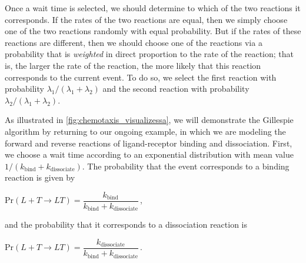 Once a wait time is selected, we should determine to which of the two reactions it corresponds. If the rates of the two reactions are equal, then we simply choose one of the two reactions randomly with equal probability. But if the rates of these reactions are different, then we should choose one of the reactions via a probability that is \textit{weighted} in direct proportion to the rate of the reaction; that is, the larger the rate of the reaction, the more likely that this reaction corresponds to the current event. To do so, we select the first reaction with probability $\lambda_1/(\lambda_1 + \lambda_2)$ and the second reaction with probability $\lambda_2/(\lambda_1 + \lambda_2)$.\\

\begin{qbox}\end{qbox}

As illustrated in \autoref{fig:chemotaxis_visualizessa}, we will demonstrate the Gillespie algorithm by returning to our ongoing example, in which we are modeling the forward and reverse reactions of ligand-receptor binding and dissociation. First, we choose a wait time according to an exponential distribution with mean value $1/(k_\text{bind} + k_\text{dissociate})$. The probability that the event corresponds to a binding reaction is given by

\begin{center}
$\mathrm{Pr}(L + T \rightarrow LT) = \dfrac{k_\text{bind}}{k_\text{bind} + k_\text{dissociate}}$\,,
\end{center}

\noindent and the probability that it corresponds to a dissociation reaction is

\begin{center}
$\mathrm{Pr}(L + T \rightarrow LT) = \dfrac{k_\text{dissociate}}{k_\text{bind} + k_\text{dissociate}}$\,.
\end{center}

